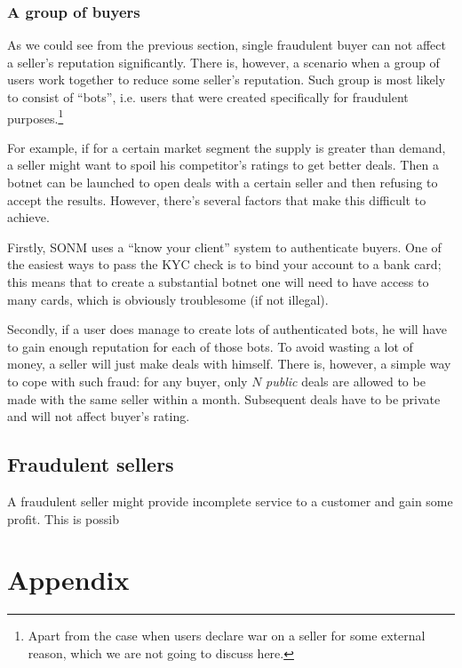 \documentclass[11pt]{article}
\begin{document}
\subsubsection{A group of buyers} \label{threatModel:buyers:group}

As we could see from the previous section, single fraudulent buyer can not affect a seller's reputation significantly. There is, however, a scenario when a group of users work together to reduce some seller's reputation. Such group is most likely to consist of ``bots'', i.e. users that were created specifically for fraudulent purposes.\footnote{Apart from the case when users declare war on a seller for some external reason, which we are not going to discuss here.}

For example, if for a certain market segment the supply is greater than demand, a seller might want to spoil his competitor's ratings to get better deals. Then a botnet can be launched to open deals with a certain seller and then refusing to accept the results. However, there's several factors that make this difficult to achieve.

Firstly, SONM uses a ``know your client'' system to authenticate buyers. One of the easiest ways to pass the KYC check is to bind your account to a bank card; this means that to create a substantial botnet one will need to have access to many cards, which is obviously troublesome (if not illegal).

Secondly, if a user does manage to create lots of authenticated bots, he will have to gain enough reputation for each of those bots. To avoid wasting a lot of money, a seller will just make deals with himself. There is, however, a simple way to cope with such fraud: for any buyer, only $ N $ \textit{public} deals are allowed to be made with the same seller within a month. Subsequent deals have to be private and will not affect buyer's rating.

\subsection{Fraudulent sellers}

A fraudulent seller might provide incomplete service to a customer and gain some profit. This is possib

\newpage

\section{Appendix} \label{appendix}
\end{document}
